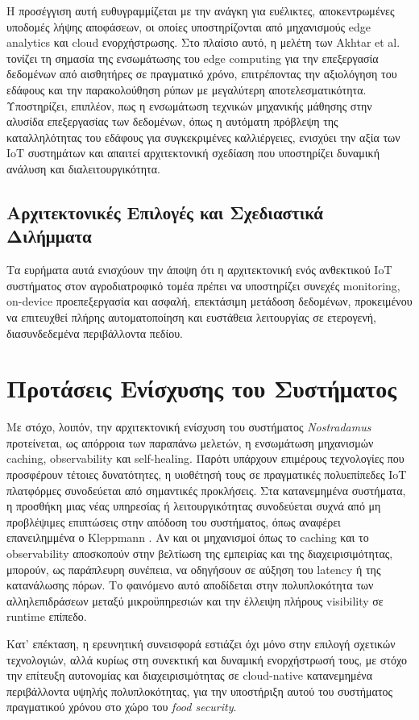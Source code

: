 Η προσέγγιση αυτή ευθυγραμμίζεται με την ανάγκη για ευέλικτες, αποκεντρωμένες υποδομές λήψης αποφάσεων, οι οποίες υποστηρίζονται από μηχανισμούς edge analytics και cloud ενορχήστρωσης. Στο πλαίσιο αυτό, η μελέτη των Akhtar et al. \cite{edgeagriculture} τονίζει τη σημασία της ενσωμάτωσης του edge computing για την επεξεργασία δεδομένων από αισθητήρες σε πραγματικό χρόνο, επιτρέποντας την αξιολόγηση του εδάφους και την παρακολούθηση ρύπων με μεγαλύτερη αποτελεσματικότητα. Υποστηρίζει, επιπλέον, πως η ενσωμάτωση τεχνικών μηχανικής μάθησης στην αλυσίδα επεξεργασίας των δεδομένων, όπως η αυτόματη πρόβλεψη της καταλληλότητας του εδάφους για συγκεκριμένες καλλιέργειες, ενισχύει την αξία των IoT συστημάτων και απαιτεί αρχιτεκτονική σχεδίαση που υποστηρίζει δυναμική ανάλυση και διαλειτουργικότητα.

\subsection{Αρχιτεκτονικές Επιλογές και Σχεδιαστικά Διλήμματα}

Τα ευρήματα αυτά ενισχύουν την άποψη ότι η αρχιτεκτονική ενός ανθεκτικού IoT συστήματος στον αγροδιατροφικό τομέα πρέπει να υποστηρίζει συνεχές monitoring, on-device προεπεξεργασία και ασφαλή, επεκτάσιμη μετάδοση δεδομένων, προκειμένου να επιτευχθεί πλήρης αυτοματοποίηση και ευστάθεια λειτουργίας σε ετερογενή, διασυνδεδεμένα περιβάλλοντα πεδίου.

\section{Προτάσεις Ενίσχυσης του Συστήματος}

Με στόχο, λοιπόν, την αρχιτεκτονική ενίσχυση του συστήματος \textit{Nostradamus} προτείνεται, ως απόρροια των παραπάνω μελετών, η ενσωμάτωση μηχανισμών caching, observability και self-healing. Παρότι υπάρχουν επιμέρους τεχνολογίες που προσφέρουν τέτοιες δυνατότητες, η υιοθέτησή τους σε πραγματικές πολυεπίπεδες IoT πλατφόρμες συνοδεύεται από σημαντικές προκλήσεις. Στα κατανεμημένα συστήματα, η προσθήκη μιας νέας υπηρεσίας ή λειτουργικότητας συνοδεύεται συχνά από μη προβλέψιμες επιπτώσεις στην απόδοση του συστήματος, όπως αναφέρει επανειλημμένα ο Kleppmann \cite{kleppmanndda}. Αν και οι μηχανισμοί όπως το caching και το observability αποσκοπούν στην βελτίωση της εμπειρίας και της διαχειρισιμότητας, μπορούν, ως παράπλευρη συνέπεια, να οδηγήσουν σε αύξηση του latency ή της κατανάλωσης πόρων. Το φαινόμενο αυτό αποδίδεται στην πολυπλοκότητα των αλληλεπιδράσεων μεταξύ μικροϋπηρεσιών και την έλλειψη πλήρους visibility σε runtime επίπεδο.

Κατ’ επέκταση, η ερευνητική συνεισφορά εστιάζει όχι μόνο στην επιλογή σχετικών τεχνολογιών, αλλά κυρίως στη συνεκτική και δυναμική ενορχήστρωσή τους, με στόχο την επίτευξη αυτονομίας και διαχειρισιμότητας σε cloud-native κατανεμημένα περιβάλλοντα υψηλής πολυπλοκότητας, για την υποστήριξη αυτού του συστήματος πραγματικού χρόνου στο χώρο του \textit{food security}.
